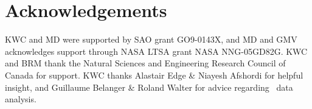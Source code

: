 \documentclass[useAMS,usenatbib]{mn2e}
\begin{document}
\section*{Acknowledgements}

KWC and MD were supported by SAO grant GO9-0143X, and MD and GMV
acknowledges support through NASA LTSA grant NASA NNG-05GD82G. KWC and
BRM thank the Natural Sciences and Engineering Research Council of
Canada for support. KWC thanks Alastair Edge \& Niayesh Afshordi for
helpful insight, and Guillaume Belanger \& Roland Walter for advice
regarding \integral\ data analysis.






\clearpage
\onecolumn




\clearpage



\label{lastpage}
\end{document}

